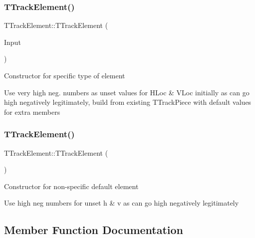 \subsubsection{\texorpdfstring{T\+Track\+Element()}{TTrackElement()}\hspace{0.1cm}{\footnotesize\ttfamily [1/2]}}
{\footnotesize\ttfamily T\+Track\+Element\+::\+T\+Track\+Element (\begin{DoxyParamCaption}\item[{\mbox{\hyperlink{class_t_fixed_track_piece}{T\+Fixed\+Track\+Piece}}}]{Input }\end{DoxyParamCaption})\hspace{0.3cm}{\ttfamily [inline]}}

Constructor for specific type of element

Use very high neg. numbers as \textquotesingle{}unset\textquotesingle{} values for H\+Loc \& V\+Loc initially as can go high negatively legitimately, build from existing T\+Track\+Piece with default values for extra members \mbox{\label{class_t_track_element_a0f269bad77fe6988e0c2e0a542410d0e}} 
\subsubsection{\texorpdfstring{T\+Track\+Element()}{TTrackElement()}\hspace{0.1cm}{\footnotesize\ttfamily [2/2]}}
{\footnotesize\ttfamily T\+Track\+Element\+::\+T\+Track\+Element (\begin{DoxyParamCaption}{ }\end{DoxyParamCaption})\hspace{0.3cm}{\ttfamily [inline]}}

Constructor for non-\/specific default element

Use high neg numbers for \textquotesingle{}unset\textquotesingle{} h \& v as can go high negatively legitimately 

\subsection{Member Function Documentation}
\mbox{\label{class_t_track_element_ab8e14338f1059d834353d6c2264b80ee}} 
